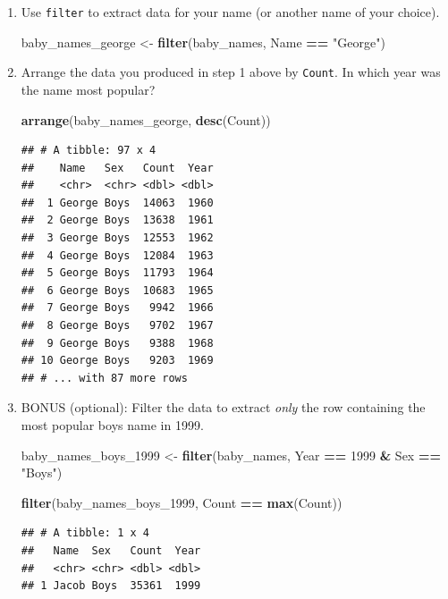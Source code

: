 \documentclass[
]{book}
\newenvironment{Shaded}{\begin{snugshade}}{\end{snugshade}}
\newcommand{\DecValTok}[1]{\textcolor[rgb]{0.00,0.00,0.81}{#1}}
\newcommand{\KeywordTok}[1]{\textcolor[rgb]{0.13,0.29,0.53}{\textbf{#1}}}
\newcommand{\NormalTok}[1]{#1}
\newcommand{\OperatorTok}[1]{\textcolor[rgb]{0.81,0.36,0.00}{\textbf{#1}}}
\newcommand{\StringTok}[1]{\textcolor[rgb]{0.31,0.60,0.02}{#1}}
\begin{document}
\begin{enumerate}
\def\labelenumi{\arabic{enumi}.}
\item
  Use \texttt{filter} to extract data for your name (or another name of your choice).

\begin{Shaded}
\begin{Highlighting}[]
\NormalTok{baby_names_george <-}\StringTok{ }\KeywordTok{filter}\NormalTok{(baby_names, Name }\OperatorTok{==}\StringTok{ "George"}\NormalTok{)}
\end{Highlighting}
\end{Shaded}
\item
  Arrange the data you produced in step 1 above by \texttt{Count}. In which year was the name most popular?

\begin{Shaded}
\begin{Highlighting}[]
\KeywordTok{arrange}\NormalTok{(baby_names_george, }\KeywordTok{desc}\NormalTok{(Count))}
\end{Highlighting}
\end{Shaded}

\begin{verbatim}
## # A tibble: 97 x 4
##    Name   Sex   Count  Year
##    <chr>  <chr> <dbl> <dbl>
##  1 George Boys  14063  1960
##  2 George Boys  13638  1961
##  3 George Boys  12553  1962
##  4 George Boys  12084  1963
##  5 George Boys  11793  1964
##  6 George Boys  10683  1965
##  7 George Boys   9942  1966
##  8 George Boys   9702  1967
##  9 George Boys   9388  1968
## 10 George Boys   9203  1969
## # ... with 87 more rows
\end{verbatim}
\item
  BONUS (optional): Filter the data to extract \emph{only} the row containing the most popular boys name in 1999.

\begin{Shaded}
\begin{Highlighting}[]
\NormalTok{baby_names_boys_}\DecValTok{1999}\NormalTok{ <-}\StringTok{ }\KeywordTok{filter}\NormalTok{(baby_names,}
\NormalTok{                               Year }\OperatorTok{==}\StringTok{ }\DecValTok{1999} \OperatorTok{&}\StringTok{ }\NormalTok{Sex }\OperatorTok{==}\StringTok{ "Boys"}\NormalTok{)}
\end{Highlighting}
\end{Shaded}

\begin{Shaded}
\begin{Highlighting}[]
\KeywordTok{filter}\NormalTok{(baby_names_boys_}\DecValTok{1999}\NormalTok{, Count }\OperatorTok{==}\StringTok{ }\KeywordTok{max}\NormalTok{(Count))}
\end{Highlighting}
\end{Shaded}

\begin{verbatim}
## # A tibble: 1 x 4
##   Name  Sex   Count  Year
##   <chr> <chr> <dbl> <dbl>
## 1 Jacob Boys  35361  1999
\end{verbatim}
\end{enumerate}
\end{document}
